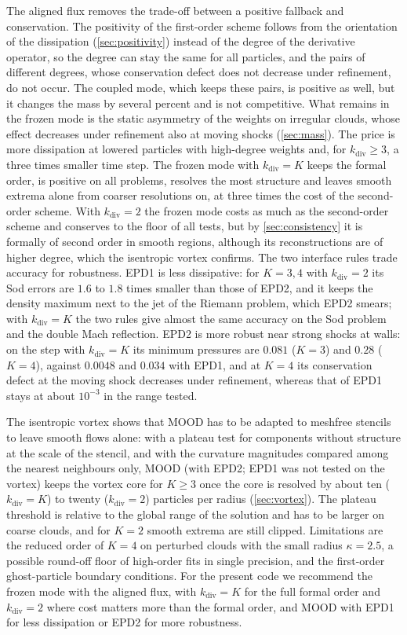 \documentclass[11pt,a4paper]{article}
\numberwithin{equation}{section}
\begin{document}
The aligned flux removes the trade-off between a positive fallback and conservation. The positivity of the first-order scheme follows from the orientation of the dissipation (\cref{sec:positivity}) instead of the degree of the derivative operator, so the degree can stay the same for all particles, and the pairs of different degrees, whose conservation defect does not decrease under refinement, do not occur. The coupled mode, which keeps these pairs, is positive as well, but it changes the mass by several percent and is not competitive. What remains in the frozen mode is the static asymmetry of the weights on irregular clouds, whose effect decreases under refinement also at moving shocks (\cref{sec:mass}). The price is more dissipation at lowered particles with high-degree weights and, for $k_{\mathrm{div}}\ge3$, a three times smaller time step. The frozen mode with $k_{\mathrm{div}}=K$ keeps the formal order, is positive on all problems, resolves the most structure and leaves smooth extrema alone from coarser resolutions on, at three times the cost of the second-order scheme. With $k_{\mathrm{div}}=2$ the frozen mode costs as much as the second-order scheme and conserves to the floor of all tests, but by \cref{sec:consistency} it is formally of second order in smooth regions, although its reconstructions are of higher degree, which the isentropic vortex confirms. The two interface rules trade accuracy for robustness. EPD1 is less dissipative: for $K=3,4$ with $k_{\mathrm{div}}=2$ its Sod errors are $1.6$ to $1.8$ times smaller than those of EPD2, and it keeps the density maximum next to the jet of the Riemann problem, which EPD2 smears; with $k_{\mathrm{div}}=K$ the two rules give almost the same accuracy on the Sod problem and the double Mach reflection. EPD2 is more robust near strong shocks at walls: on the step with $k_{\mathrm{div}}=K$ its minimum pressures are $0.081$ ($K=3$) and $0.28$ ($K=4$), against $0.0048$ and $0.034$ with EPD1, and at $K=4$ its conservation defect at the moving shock decreases under refinement, whereas that of EPD1 stays at about $10^{-3}$ in the range tested.

The isentropic vortex shows that MOOD has to be adapted to meshfree stencils to leave smooth flows alone: with a plateau test for components without structure at the scale of the stencil, and with the curvature magnitudes compared among the nearest neighbours only, MOOD (with EPD2; EPD1 was not tested on the vortex) keeps the vortex core for $K\ge3$ once the core is resolved by about ten ($k_{\mathrm{div}}=K$) to twenty ($k_{\mathrm{div}}=2$) particles per radius (\cref{sec:vortex}). The plateau threshold is relative to the global range of the solution and has to be larger on coarse clouds, and for $K=2$ smooth extrema are still clipped. Limitations are the reduced order of $K=4$ on perturbed clouds with the small radius $\kappa=2.5$, a possible round-off floor of high-order fits in single precision, and the first-order ghost-particle boundary conditions. For the present code we recommend the frozen mode with the aligned flux, with $k_{\mathrm{div}}=K$ for the full formal order and $k_{\mathrm{div}}=2$ where cost matters more than the formal order, and MOOD with EPD1 for less dissipation or EPD2 for more robustness.
\end{document}
